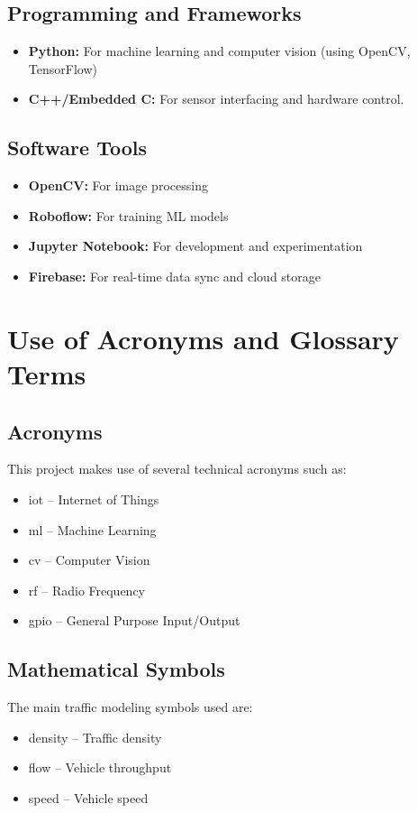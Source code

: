 \subsection{Programming and Frameworks}
\begin{itemize}
    \item \textbf{Python:} For machine learning and computer vision (using OpenCV, TensorFlow)
    \item \textbf{C++/Embedded C:} For sensor interfacing and hardware control.
\end{itemize}

\subsection{Software Tools}
\begin{itemize}
    \item \textbf{OpenCV:} For image processing
    \item \textbf{Roboflow:} For training ML models
    \item \textbf{Jupyter Notebook:} For development and experimentation
    \item \textbf{Firebase:} For real-time data sync and cloud storage
\end{itemize}

\section{Use of Acronyms and Glossary Terms}

\subsection{Acronyms}
This project makes use of several technical acronyms such as:
\begin{itemize}
    \item \gls{iot} – Internet of Things
    \item \gls{ml} – Machine Learning
    \item \gls{cv} – Computer Vision
    \item \gls{rf} – Radio Frequency
    \item \gls{gpio} – General Purpose Input/Output
\end{itemize}

\subsection{Mathematical Symbols}
The main traffic modeling symbols used are:
\begin{itemize}
    \item \gls{density} – Traffic density
    \item \gls{flow} – Vehicle throughput
    \item \gls{speed} – Vehicle speed
\end{itemize}

